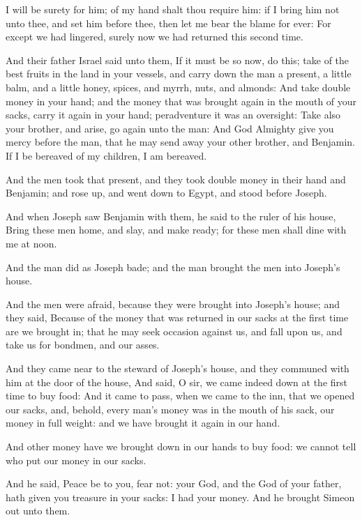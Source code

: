 \verse I will be surety for him; of my hand shalt thou require him: if I bring him not unto thee, and set him before thee, then let me bear the blame for ever: \verse For except we had lingered, surely now we had returned this second time.

\verse And their father Israel said unto them, If it must be so now, do this; take of the best fruits in the land in your vessels, and carry down the man a present, a little balm, and a little honey, spices, and myrrh, nuts, and almonds: \verse And take double money in your hand; and the money that was brought again in the mouth of your sacks, carry it again in your hand; peradventure it was an oversight: \verse Take also your brother, and arise, go again unto the man: \verse And God Almighty give you mercy before the man, that he may send away your other brother, and Benjamin. If I be bereaved of my children, I am bereaved.

\verse And the men took that present, and they took double money in their hand and Benjamin; and rose up, and went down to Egypt, and stood before Joseph.

\verse And when Joseph saw Benjamin with them, he said to the ruler of his house, Bring these men home, and slay, and make ready; for these men shall dine with me at noon.

\verse And the man did as Joseph bade; and the man brought the men into Joseph's house.

\verse And the men were afraid, because they were brought into Joseph's house; and they said, Because of the money that was returned in our sacks at the first time are we brought in; that he may seek occasion against us, and fall upon us, and take us for bondmen, and our asses.

\verse And they came near to the steward of Joseph's house, and they communed with him at the door of the house, \verse And said, O sir, we came indeed down at the first time to buy food: \verse And it came to pass, when we came to the inn, that we opened our sacks, and, behold, every man's money was in the mouth of his sack, our money in full weight: and we have brought it again in our hand.

\verse And other money have we brought down in our hands to buy food: we cannot tell who put our money in our sacks.

\verse And he said, Peace be to you, fear not: your God, and the God of your father, hath given you treasure in your sacks: I had your money.  And he brought Simeon out unto them.

